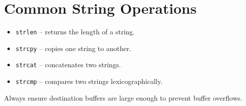 \documentclass[11pt,a4paper]{article}
\begin{document}
\section{Common String Operations}
\begin{itemize}
  \item \texttt{strlen} -- returns the length of a string.
  \item \texttt{strcpy} -- copies one string to another.
  \item \texttt{strcat} -- concatenates two strings.
  \item \texttt{strcmp} -- compares two strings lexicographically.
\end{itemize}

Always ensure destination buffers are large enough to prevent buffer overflows.
\end{document}
